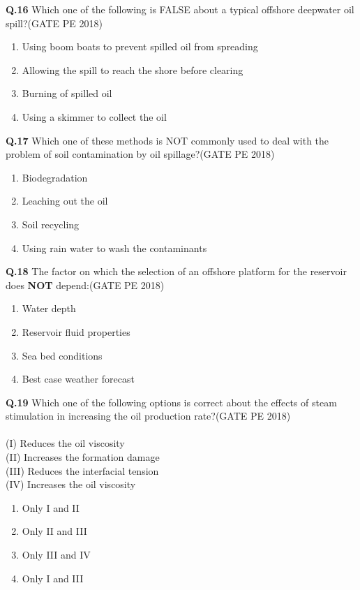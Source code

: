 \documentclass[15pt,a4paper]{article}
\begin{document}
\noindent
\textbf{Q.16} Which one of the following is FALSE about a typical offshore deepwater oil spill?\hfill(GATE PE 2018)
\begin{enumerate}
\item Using boom boats to prevent spilled oil from spreading
\item Allowing the spill to reach the shore before clearing
\item Burning of spilled oil
\item Using a skimmer to collect the oil
\end{enumerate}
\noindent
\textbf{Q.17} Which one of these methods is NOT commonly used to deal with the problem of soil
contamination by oil spillage?\hfill(GATE PE 2018)
\begin{enumerate}
\item Biodegradation
\item Leaching out the oil
\item Soil recycling
\item Using rain water to wash the contaminants
\end{enumerate}
\noindent
\textbf{Q.18} The factor on which the selection of an offshore platform for the reservoir does \textbf{NOT}
depend:\hfill(GATE PE 2018)
\begin{enumerate}
\item Water depth
\item Reservoir fluid properties
\item Sea bed conditions
\item Best case weather forecast
\end{enumerate}

\noindent
\textbf{Q.19} Which one of the following options is correct about the effects of steam stimulation in
increasing the oil production rate?\hfill(GATE PE 2018)\\\\
(I) Reduces the oil viscosity\\
(II) Increases the formation damage\\
(III) Reduces the interfacial tension\\
(IV) Increases the oil viscosity
\begin{enumerate}
\item Only I and II
\item Only II and III
\item Only III and IV
\item Only I and III
\end{enumerate}
\pagebreak
\end{document}
